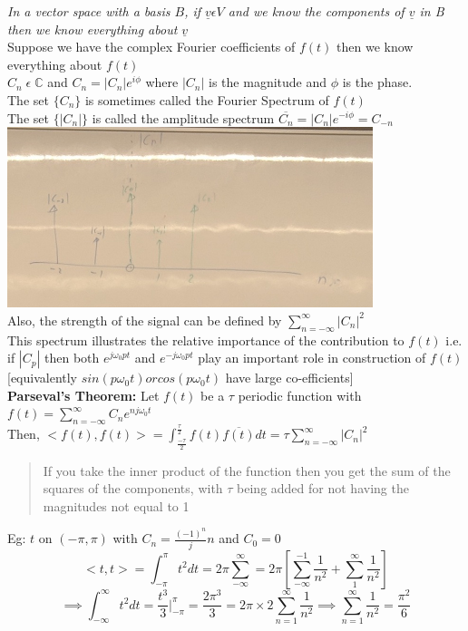 \documentclass[11pt]{article}
\theoremstyle{definition}
\newcommand{\C}{\mathbb{C}}
\begin{document}
\textit{In a vector space with a basis $B$, if $\underline{v} \epsilon V$ and we know the components of $\underline{v}$ in B then we know everything about $\underline{v}$}\\
Suppose we have the complex Fourier coefficients of $f(t)$ then we know everything about $f(t)$\\
$C_n\; \epsilon\; \C$ and $C_n = |C_n|e^{i\phi}$ where $|C_n|$ is the magnitude and $\phi$ is the phase.\\
The set $\{C_n\}$ is sometimes called the Fourier Spectrum of  $f(t)$\\
The set $\{|C_n|\}$ is called the amplitude spectrum
$\overline{C_n} = |C_n|e^{-i\phi} = C_{-n}$\\
\includegraphics[width=0.8\textwidth]{MVIMG_20181113_085445.jpg}\\
Also, the strength of the signal can be defined by $\sum_{n=-\infty}^\infty |C_n|^2 $\\
This spectrum illustrates the relative importance of the contribution to $f(t)$ i.e. if $|C_p|$ then both $e^{j\omega_0 pt}$ and $e^{-j\omega_0 pt}$ play an important role in construction of $f(t)$ [equivalently $sin(p\omega_0 t) or cos(p\omega_0 t)$ have large co-efficients]\\
\hfill\break
\textbf{Parseval's Theorem:} Let $f(t)$ be a $\tau$ periodic function with $f(t) = \sum_{n=-\infty}^\infty C_n e^{nj\omega_0 t} $\\
Then, $<f(t), f(t)> = \int^{\frac{\tau}{2}}_{\frac{-\tau}{2}} f(t)\overline{f(t)}dt = \tau \sum_{n=-\infty}^\infty |C_n|^2$

\begin{quote}
If you take the inner product of the function then you get the sum of the squares of the components, with $\tau$ being added for not having the magnitudes not equal to 1
\end{quote}
Eg: $t$ on $(-\pi, \pi)$ with $C_n = \frac{(-1)^n}j{n}$ and $C_0 = 0$\\
$$<t, t> = \int^\pi_{-\pi}t^2dt = 2\pi \sum_{-\infty}^\infty = 2\pi [\sum_{-\infty}^{-1}\frac{1}{n^2} + \sum_1^\infty\frac{1}{n^2}]$$
$$\implies \int_{-\infty}^\infty t^2 dt = \frac{t^3}{3}|^\pi_{-\pi} = \frac{2\pi^3}{3} = 2\pi \times 2 \sum_{n =1}^\infty \frac{1}{n^2} \implies \sum_{n =1}^\infty \frac{1}{n^2} = \frac{\pi^2}{6}$$
\end{document}
